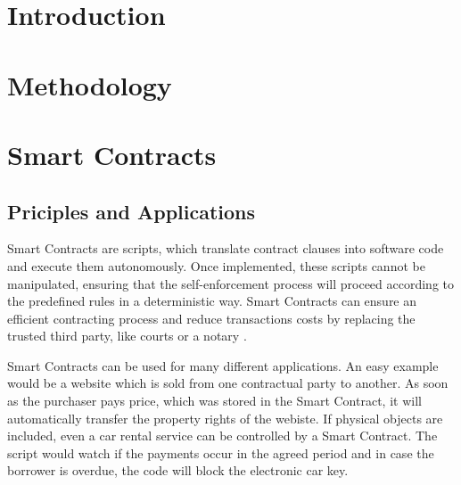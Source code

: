 \documentclass[conference]{IEEEtran}
\begin{document}




%
\IEEEpeerreviewmaketitle



\section{Introduction}



 

\section{Methodology}

\section{Smart Contracts}
\subsection{Priciples and Applications}

Smart Contracts are scripts, which translate contract clauses into software code and execute them autonomously. Once implemented, these scripts cannot be manipulated, ensuring that the self-enforcement process will proceed according to the predefined rules in a deterministic way. Smart Contracts can ensure an efficient contracting process and reduce transactions costs by replacing the trusted third party, like courts or a notary \cite{Meitinger2017} \cite{Spancken2016}.\par  
 
Smart Contracts can be used for many different applications. An easy example would be a website which is sold from one contractual party to another. As soon as the purchaser pays price, which was stored in the Smart Contract, it will automatically transfer the property rights of the webiste. If physical objects are included, even a car rental service can be controlled by a Smart Contract. The script would watch if the payments occur in the agreed period and in case the borrower is overdue, the code will block the electronic car key. \cite{Jung2017} \cite{Lee2016}
\end{document}
